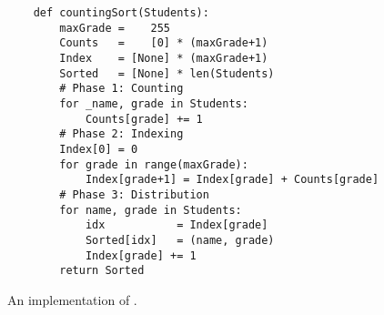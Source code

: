 \begin{figure}[!ht]
\centering
\begin{verbatim}
    def countingSort(Students):
        maxGrade =    255
        Counts   =    [0] * (maxGrade+1)
        Index    = [None] * (maxGrade+1)
        Sorted   = [None] * len(Students)
        # Phase 1: Counting
        for _name, grade in Students:
            Counts[grade] += 1
        # Phase 2: Indexing
        Index[0] = 0
        for grade in range(maxGrade):
            Index[grade+1] = Index[grade] + Counts[grade]
        # Phase 3: Distribution
        for name, grade in Students:
            idx           = Index[grade]
            Sorted[idx]   = (name, grade)
            Index[grade] += 1
        return Sorted
\end{verbatim}
\vspace*{-0.3cm}
\caption{An implementation of .}
\label{fig:counting-sort.stlx}
\end{figure}

